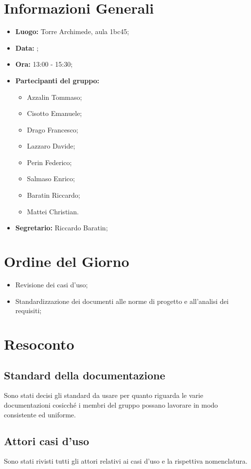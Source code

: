 \section{Informazioni Generali}
\begin{itemize}
\item \textbf{Luogo:} Torre Archimede, aula 1bc45;
\item \textbf{Data:} \Data;
\item \textbf{Ora:} 13:00 - 15:30;
\item \textbf{Partecipanti del gruppo:}
	\begin{itemize}
	\item Azzalin Tommaso; 
	\item Cisotto Emanuele; 
	\item Drago Francesco;
	\item Lazzaro Davide;
	\item Perin Federico;
	\item Salmaso Enrico;
	\item Baratin Riccardo;
	\item Mattei Christian.
	\end{itemize} 
\item \textbf{Segretario:} Riccardo Baratin;
\end{itemize}

\clearpage

\section{Ordine del Giorno}
\begin{itemize}
	\item Revisione dei casi d'uso;
	\item Standardizzazione dei documenti alle norme di progetto e all'analisi dei requisiti;
	
\end{itemize}

\clearpage

\section{Resoconto}
\subsection{Standard della documentazione}
Sono stati decisi gli standard da usare per quanto riguarda le varie documentazioni cosicché i membri del gruppo possano lavorare in modo consistente ed uniforme. \\

\subsection{Attori casi d'uso}
Sono stati rivisti tutti gli attori relativi ai casi d'uso e la rispettiva nomenclatura. \\

\clearpage